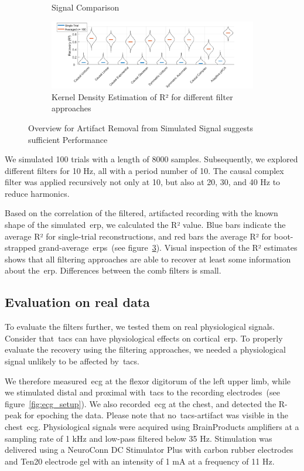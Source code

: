\documentclass[a4paper]{article}
\newcommand{\figref}[1]{(see figure~\ref{#1})}
\begin{document}
\begin{figure}[hbtp]
\begin{subfigure}{0.75\textwidth}
\begin{subfigure}{.45\textwidth}
        \end{subfigure}
    \caption{Signal Comparison}\label{fig:simRaw}
    \end{subfigure}
    \begin{subfigure}{1.0\textwidth}
        \includegraphics[width=\textwidth]{img/eva/sim_R2.png}
        \caption{Kernel Density Estimation of R² for different filter approaches}\label{fig:simR2}
    \end{subfigure}
    \caption{Overview for Artifact Removal from  Simulated Signal suggests sufficient Performance}
\end{figure}

We simulated 100 trials with a length of 8000 samples. Subsequently, we explored different filters for 10 Hz, all with a period number of 10. The causal complex filter was applied recursively not only at 10, but also at 20, 30, and 40 Hz to reduce harmonics.

Based on  the correlation of the filtered, artifacted recording with the known shape of the simulated~\gls{erp}, we calculated the R² value. Blue bars indicate the average R² for single-trial reconstructions, and red bars the average R² for boot-strapped grand-average~\gls{erp}s~\figref{fig:simR2}. Visual inspection of the R² estimates shows that all filtering approaches are able to recover at least some information about the~\gls{erp}. Differences between the comb filters is small.

\subsection{Evaluation on real data}\label{sec:EvaluationData}

To evaluate the filters further, we tested them on real physiological signals. Consider that~\gls{tacs} can have physiological effects on cortical~\gls{erp}. To properly evaluate the recovery using the filtering approaches, we needed a physiological signal unlikely to be affected by~\gls{tacs}.

We therefore measured~\gls{ecg} at the flexor digitorum of the left upper limb, while we stimulated distal and proximal with~\gls{tacs} to the recording electrodes~\figref{fig:ecg_setup}. We also recorded~\gls{ecg} at the chest, and detected the R-peak for epoching the data. Please note that no~\gls{tacs}-artifact was visible in the chest~\gls{ecg}.
Physiological signals were acquired using BrainProducts amplifiers at a sampling rate of 1 kHz and low-pass filtered below 35 Hz. Stimulation was delivered using a NeuroConn DC Stimulator Plus with carbon rubber electrodes and Ten20 electrode gel with an intensity of 1 mA at a frequency of 11 Hz.
\end{document}
